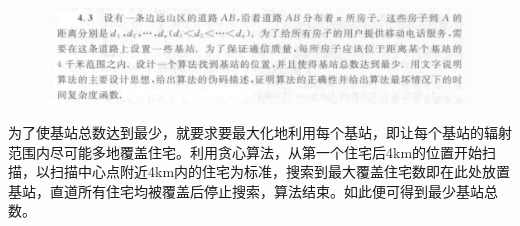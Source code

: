 \begin{tcolorbox}[colback=white!10!white,colframe=pink!100!black]
	\begin{figure}[H]
		\centering
		\includegraphics[width=0.8\linewidth]{screenshot033}
		\label{fig:screenshot033}
	\end{figure}
\end{tcolorbox}
\begin{solution}
\end{solution}
为了使基站总数达到最少，就要求要最大化地利用每个基站，即让每个基站的辐射范围内尽可能多地覆盖住宅。利用贪心算法，从第一个住宅后4km的位置开始扫描，以扫描中心点附近4km内的住宅为标准，搜索到最大覆盖住宅数即在此处放置基站，直道所有住宅均被覆盖后停止搜索，算法结束。如此便可得到最少基站总数。

